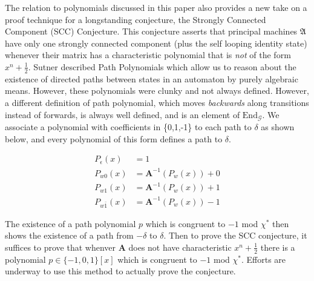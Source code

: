 \documentclass[runningheads]{llncs}
\newcommand{\G}{\mathcal{G}}
\renewcommand{\P}{\mathfrak{A}}
\newcommand{\2}{\textbf{2}}
\newcommand{\Am}{\textbf{A}}
\begin{document}
The relation to polynomials discussed in this paper also provides a new take 
on a proof technique for a longstanding conjecture,
the Strongly Connected Component (SCC) Conjecture. This conjecture 
asserts that principal machines $\P$ have only one strongly connected component 
(plus the self looping identity state) whenever their matrix has a 
characteristic polynomial that is \emph{not} of the form $x^n + \frac{1}{2}$.
Sutner described Path Polynomials \cite{Sutner18:abelian_automata} which
allow us to reason about the existence of directed paths between states 
in an automaton by purely algebraic means. However, these polynomials were
clunky and not always defined. However, a different definition of path 
polynomial, which moves \emph{backwards} along transitions 
instead of forwards, is always well defined, and is an element of 
$\text{End}_{\G}$. We associate a polynomial with coefficients in \{0,1,-1\} 
to each path to $\delta$ as shown below, and every polynomial of this form 
defines a path to $\delta$.

\begin{align*}
  P_\epsilon(x)   &= 1\\
  P_{w0}(x)       &= \Am^{-1}(P_w(x)) + 0\\
  P_{w1}(x)       &= \Am^{-1}(P_w(x)) + 1\\
  P_{w\bar{1}}(x) &= \Am^{-1}(P_w(x)) - 1
\end{align*}

The existence of a path polynomial $p$ which is congruent to $-1$ mod $\chi^*$
then shows the existence of a path from $-\delta$ to $\delta$.
Then to prove the SCC conjecture, it suffices to prove that whenver $\Am$ 
does not have characteristic $x^n + \frac{1}{2}$ there is a polynomial 
$p \in \{-1,0,1\}[x]$ which is congruent to $-1$ mod $\chi^*$. 
Efforts are underway to use this method to actually prove the conjecture.

\newpage



\end{document}

